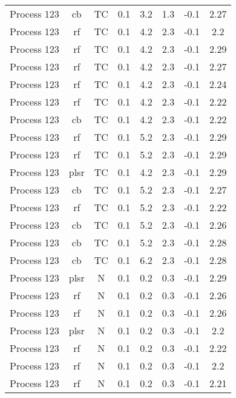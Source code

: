 \documentclass[a4paper,12pt,twoside]{article}
\begin{document}
\begin{ThreePartTable}
\begin{longtable}[c]{ l c c c c c c c }
		\endfoot
		\bottomrule
		\insertTableNotes  %
		\endlastfoot
		Process 123                & cb   & TC & 0.1 & 3.2 & 1.3 & -0.1 & 2.27 \\
		Process 123                & rf   & TC & 0.1 & 4.2 & 2.3 & -0.1 & 2.2  \\
		Process 123                & rf   & TC & 0.1 & 4.2 & 2.3 & -0.1 & 2.29 \\
		Process 123                & rf   & TC & 0.1 & 4.2 & 2.3 & -0.1 & 2.27 \\
		Process 123                & rf   & TC & 0.1 & 4.2 & 2.3 & -0.1 & 2.24 \\
		Process 123                & rf   & TC & 0.1 & 4.2 & 2.3 & -0.1 & 2.22 \\
		Process 123                & cb   & TC & 0.1 & 4.2 & 2.3 & -0.1 & 2.22 \\
		Process 123                & rf   & TC & 0.1 & 5.2 & 2.3 & -0.1 & 2.29 \\
		Process 123                & rf   & TC & 0.1 & 5.2 & 2.3 & -0.1 & 2.29 \\
		Process 123                & plsr & TC & 0.1 & 4.2 & 2.3 & -0.1 & 2.29 \\
		Process 123                & cb   & TC & 0.1 & 5.2 & 2.3 & -0.1 & 2.27 \\
		Process 123                & rf   & TC & 0.1 & 5.2 & 2.3 & -0.1 & 2.22 \\
		Process 123                & cb   & TC & 0.1 & 5.2 & 2.3 & -0.1 & 2.26 \\
		Process 123                & cb   & TC & 0.1 & 5.2 & 2.3 & -0.1 & 2.28 \\
		Process 123                & cb   & TC & 0.1 & 6.2 & 2.3 & -0.1 & 2.28 \\
		Process 123                & plsr & N  & 0.1 & 0.2 & 0.3 & -0.1 & 2.29 \\
		Process 123                & rf   & N  & 0.1 & 0.2 & 0.3 & -0.1 & 2.26 \\
		Process 123                & rf   & N  & 0.1 & 0.2 & 0.3 & -0.1 & 2.26 \\
		Process 123                & plsr & N  & 0.1 & 0.2 & 0.3 & -0.1 & 2.2  \\
		Process 123                & rf   & N  & 0.1 & 0.2 & 0.3 & -0.1 & 2.22 \\
		Process 123                & rf   & N  & 0.1 & 0.2 & 0.3 & -0.1 & 2.2  \\
		Process 123                & rf   & N  & 0.1 & 0.2 & 0.3 & -0.1 & 2.21 \\

\end{longtable}
\end{ThreePartTable}
\end{document}
